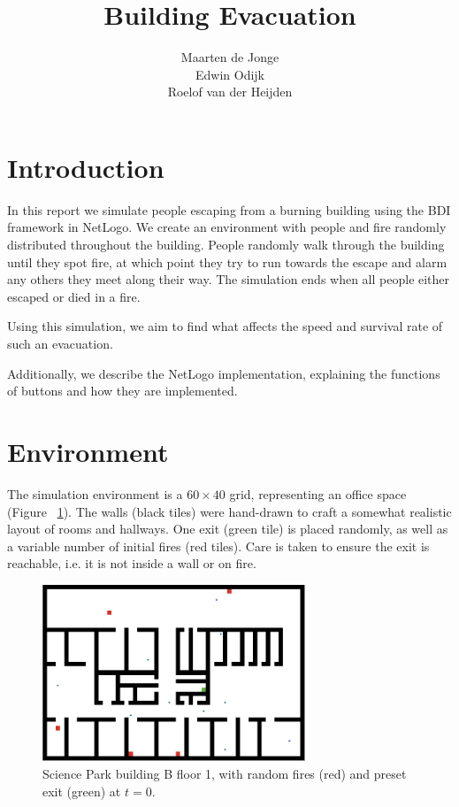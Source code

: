 \documentclass[a4paper]{article}
\title{Building Evacuation}
\author{Maarten de Jonge \\
        Edwin Odijk \\
        Roelof van der Heijden}
\begin{document}
\maketitle

\section{Introduction}
In this report we simulate people escaping from a burning building using the BDI framework in NetLogo. We create an environment with people and fire randomly distributed throughout the building. People randomly walk through the building until they spot fire, at which point they try to run towards the escape and alarm any others they meet along their way. The simulation ends when all people either escaped or died in a fire.

Using this simulation, we aim to find what affects the speed and survival rate of such an evacuation.

Additionally, we describe the NetLogo implementation, explaining the functions of buttons and how they are implemented.

\section{Environment}
\FloatBarrier
The simulation environment is a \(60\times 40\) grid, representing an office space (Figure~
\ref{fig:office}). The walls (black tiles) were hand-drawn to craft a somewhat
realistic layout of rooms and hallways. One exit (green tile) is placed
randomly, as well as a variable number of initial fires (red tiles). Care is
taken to ensure the exit is reachable, i.e. it is not inside a wall or on fire.

\begin{figure}[h!]
  \centering
  \includegraphics[width=0.7\textwidth]{sp.png}
  \caption{Science Park building B floor 1, with random fires (red) and preset exit (green) at \(t=0\).}
  \label{fig:office}
\end{figure}
\end{document}
